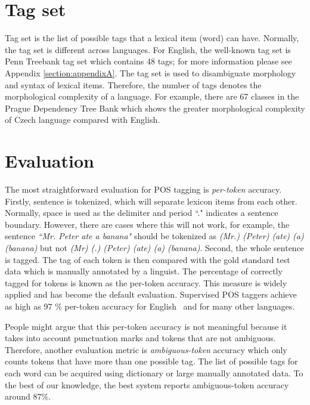 \section{Tag set}
Tag set is the list of possible tags that a lexical item (word) can have. Normally, the tag set is different across languages. For English, the well-known tag set is Penn Treebank \cite{PenTreeBank} tag set which contains 48 tags; for more information please see Appendix \ref{section:appendixA}. The tag set is used to disambiguate morphology and syntax of lexical items. Therefore, the number of tags denotes the morphological complexity of a language. For example, there are 67 classes in the Prague Dependency Tree Bank \cite{HajicHajicovaAl2000} which shows the greater morphological complexity of Czech language compared with English. 
\section{Evaluation}
The most straightforward evaluation for POS tagging is \emph{per-token} accuracy. Firstly, sentence is tokenized, which will separate lexicon items from each other. Normally, space is used as the delimiter and period ``." indicates a sentence boundary. However, there are cases where this will not work, for example, the sentence \textit{``Mr. Peter ate a banana"} should be tokenized as \textit{(Mr.) (Peter) (ate) (a) (banana)} but not \textit{(Mr) (.) (Peter) (ate) (a) (banana)}. Second, the whole sentence is tagged. The tag of each token is then compared with the gold standard test data which is manually annotated by a linguist. The percentage of correctly tagged for tokens is known as the per-token accuracy. This measure is widely applied and has become the default evaluation. Supervised POS taggers achieve as high as 97 \% per-token accuracy for English~\cite{Toutanova:2003} and for many other languages. 

People might argue that this per-token accuracy is not meaningful because it takes into account punctuation marks and tokens that are not ambiguous. Therefore, another evaluation metric is  \emph{ambiguous-token} accuracy which only counts tokens that have more than one possible tag. The list of possible tags for each word can be acquired using dictionary or large manually annotated data. To the best of our knowledge, the best system \cite{Yoshida:2007} reports ambiguous-token accuracy around 87\%. 

